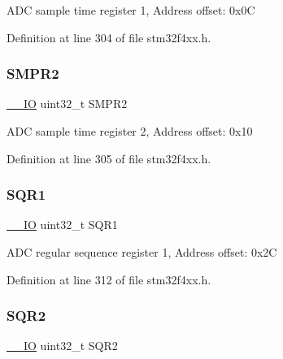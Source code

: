 A\+DC sample time register 1, Address offset\+: 0x0C 

Definition at line 304 of file stm32f4xx.\+h.

\mbox{\label{struct_a_d_c___type_def_a6ac83fae8377c7b7fcae50fa4211b0e8}} 
\subsubsection{\texorpdfstring{S\+M\+P\+R2}{SMPR2}}
{\footnotesize\ttfamily \hyperlink{group___c_m_s_i_s__core__definitions_gaec43007d9998a0a0e01faede4133d6be}{\+\_\+\+\_\+\+IO} uint32\+\_\+t S\+M\+P\+R2}

A\+DC sample time register 2, Address offset\+: 0x10 

Definition at line 305 of file stm32f4xx.\+h.

\mbox{\label{struct_a_d_c___type_def_a3302e1bcfdfbbfeb58779d0761fb377c}} 
\subsubsection{\texorpdfstring{S\+Q\+R1}{SQR1}}
{\footnotesize\ttfamily \hyperlink{group___c_m_s_i_s__core__definitions_gaec43007d9998a0a0e01faede4133d6be}{\+\_\+\+\_\+\+IO} uint32\+\_\+t S\+Q\+R1}

A\+DC regular sequence register 1, Address offset\+: 0x2C 

Definition at line 312 of file stm32f4xx.\+h.

\mbox{\label{struct_a_d_c___type_def_aab440b0ad8631f5666dd32768a89cf60}} 
\subsubsection{\texorpdfstring{S\+Q\+R2}{SQR2}}
{\footnotesize\ttfamily \hyperlink{group___c_m_s_i_s__core__definitions_gaec43007d9998a0a0e01faede4133d6be}{\+\_\+\+\_\+\+IO} uint32\+\_\+t S\+Q\+R2}


